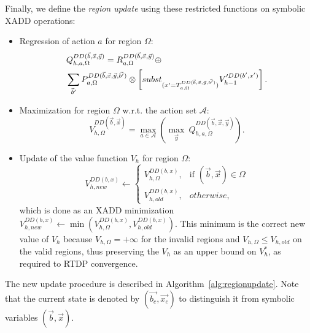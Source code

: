 \documentclass[letterpaper]{article}
\begin{document}
Finally, we define the \emph{region update} using these restricted functions on symbolic XADD operations:
\begin{itemize}
\item {
Regression of action $a$ for region $\Omega$:
\begin{align}
Q_{h,a,\Omega}^{DD(\vec{b},\vec{x},\vec{y})} & =  R_{a,\Omega}^{DD(\vec{b},\vec{x},\vec{y})} \oplus \nonumber \\
	& \hspace{-1.6cm}  \sum_{\vec{b}'}  P_{a,\Omega}^{DD(\vec{b},\vec{x},\vec{y},\vec{b'})} \otimes \left[ subst_{(x' = T_{a,\Omega}^{DD(\vec{b},\vec{x},\vec{y},\vec{b'})})} V_{h-1}'^{DD(b',x')} \right]. 
\label{eq:RTSDPregrDD}
\end{align}
}
\item{
Maximization for region $\Omega$ w.r.t. the action set $\mathcal{A}$:
\begin{equation}
V_{h,\Omega}^{DD(\vec{b},\vec{x})} = \max_{a\in\mathcal{A}} \left( \max_{\vec{y}}~ Q_{h,a,\Omega}^{DD(\vec{b},\vec{x},\vec{y})} \right).
\label{eq:RTSDPmaxDD}
\end{equation}
}
\item{
Update of the value function $V_h$ for region $\Omega$:
\begin{equation}
V_{h,new}^{DD(b, x)} \leftarrow \begin{cases}
	V_{h,\Omega}^{DD(b, x)},&\mbox{if } (\vec{b},\vec{x}) \in \Omega\\
	V_{h,old}^{DD(b, x)}, & otherwise,
	\end{cases}
\end{equation}
which is done as an XADD minimization $V_{h,new}^{DD(b, x)} \leftarrow \min( V_{h,\Omega}^{DD(b, x)}, V_{h,old}^{DD(b, x)})$.
This minimum is the correct new value of $V_h$ because $V_{h,\Omega} = +\infty$ for the invalid regions and $V_{h,\Omega} \leq V_{h,old}$ on the valid regions, thus preserving the $V_h$ as an upper bound on $V^*_h$, as required to RTDP convergence.
}
\end{itemize}

The new update procedure is described in Algorithm~\ref{alg:regionupdate}.
Note that the current state is denoted by $(\vec{b_c}, \vec{x_c})$ to distinguish it from symbolic variables $(\vec{b}, \vec{x})$.
\end{document}
